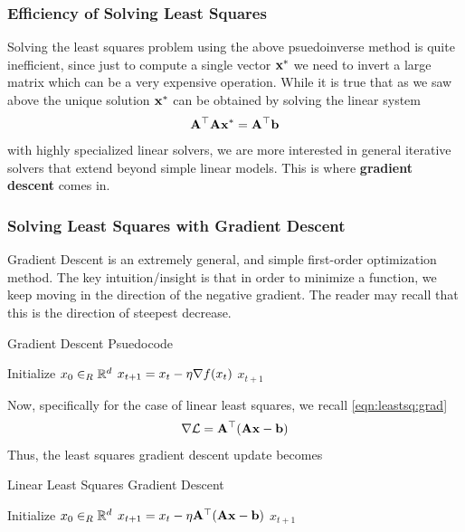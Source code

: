         \subsubsection{Efficiency of Solving Least Squares}
        Solving the least squares problem using the above psuedoinverse method is quite inefficient, since just to compute a single vector $\mathbf{x}^*$ we need to invert a large matrix which can be a very expensive operation. While it is true that as we saw above the unique solution $\mathbf{x}^*$ can be obtained by solving the linear system
        \begin{align*}
            \mathbf{A}^\top \mathbf{A} \mathbf{x}^* = \mathbf{A}^\top {\bf b}
        \end{align*}
        with highly specialized linear solvers, we are more interested in general iterative solvers that extend beyond simple linear models. This is where \textbf{gradient descent} comes in.
        
        \subsubsection{Solving Least Squares with Gradient Descent}
        Gradient Descent is an extremely general, and simple first-order optimization method. The key intuition/insight is that in order to minimize a function, we keep moving in the direction of the negative gradient. The reader may recall that this is the direction of steepest decrease.
        \begin{algorithm}[H]
        \caption{Gradient Descent Psuedocode}
        \label{algo:gd}
        \begin{algorithmic}[1]
        \State Initialize $x_0 \in_R \mathbb{R}^d$
            \State $x_{t+1} = x_t - \eta \nabla f(x_t)$
        \EndWhile
        \Return $x_{t+1}$
        \EndProcedure
        \end{algorithmic}
        \end{algorithm}
        Now, specifically for the case of linear least squares, we recall \autoref{eqn:leastsq:grad}
        \begin{align*}
            \nabla \mathcal{L} = \mathbf{A}^\top (\mathbf{A}\mathbf{x} - {\bf b})
        \end{align*}
        Thus, the least squares gradient descent update becomes
              \begin{algorithm}
        \label{algo:leastsq:gd}
        \caption{Linear Least Squares Gradient Descent}
        \begin{algorithmic}[1]
        \State Initialize $x_0 \in_R \mathbb{R}^d$
            \State $x_{t+1} = x_t - \eta \mathbf{A}^\top (\mathbf{A}\mathbf{x} - {\bf b})$
        \EndWhile
        \Return $x_{t+1}$
        \EndProcedure
        \end{algorithmic}
        \end{algorithm}
        
